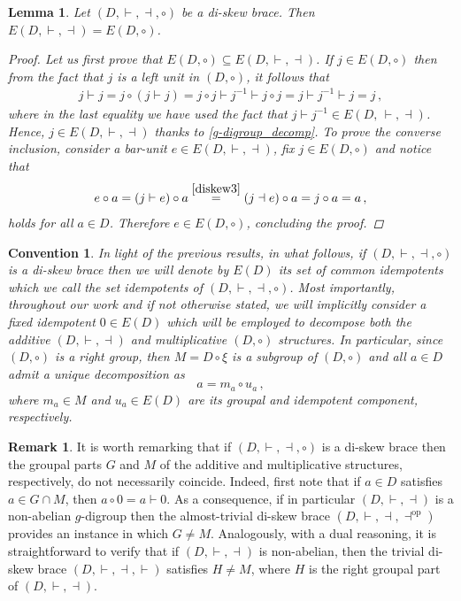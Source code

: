 \documentclass[preprint,1p]{elsarticle}
\numberwithin{equation}{section}
\newtheorem{lemma}[theor]{Lemma}
\newtheorem{convention}[theor]{Convention}
\theoremstyle{definition}               %
\newtheorem{rem}[theor]{Remark}
\newcommand{\vd}{\vdash}
\newcommand{\dv}{\dashv}
\newcommand{\overeq}[1]{\overset{#1}{=}}
\begin{document}
\begin{lemma}\label{common_idemp}
    Let $(D,\vd,\dv,\circ)$ be a di-skew brace.
    Then $E(D,\vd,\dv) = E(D,\circ)$.
    \begin{proof}
        Let us first prove that $E(D,\circ) \subseteq E(D,\vd,\dv)$.
        If $j \in E(D,\circ)$ then from the fact that $j$ is a left unit in $(D,\circ)$, it follows that
        \begin{align*}
            j \vd j = j \circ (j \vd j) 
            = j \circ j \vd j^{-1} \vd j \circ j 
            = j \vd j^{-1} \vd j 
            = j \,,
        \end{align*}
        where in the last equality we have used the fact that $j \vd j^{-1} \in E(D,\,\vd,\dv)$.
        Hence, ${j \in E(D,\vd,\dv)}$ thanks to \cref{g-digroup_decomp}.
        To prove the converse inclusion, consider a bar-unit $e \in E(D,\vd,\dv)$, fix $j \in E(D,\circ)$ and notice that 
        \begin{align*}
            e \circ a = (j \vd e) \circ a \overeq{\eqref{diskew3}} (j \dv e) \circ a = j \circ a = a \,,
        \end{align*}
        holds for all $a \in D$.
        Therefore $e \in E(D,\circ)$, concluding the proof.
    \end{proof}
\end{lemma}

\begin{convention}\label{convenzione}
    \textnormal{In light of the previous results, in what follows, if $(D,\vd,\dv,\circ)$ is a di-skew brace then we will denote by $E(D)$ its set of common idempotents which we call the set \emph{idempotents} of $(D,\vd,\dv,\circ)$.
    Most importantly, throughout our work and if not otherwise stated, we will implicitly consider a fixed idempotent $0 \in E(D)$ which will be employed to decompose both the additive $(D,\vd,\dv)$ and multiplicative $(D,\circ)$ structures.
    In particular, since $(D,\circ)$ is a right group, then $M = D \circ \xi$ is a subgroup of $(D,\circ)$ and all $a \in D$ admit a unique decomposition as 
    $$
    a = m_a \circ u_a \,,
    $$
    where $m_a\in M$ and $u_a\in E(D)$ are its groupal and idempotent component, respectively.}
\end{convention}

\begin{rem}
    It is worth remarking that if $(D,\vd,\dv,\circ)$ is a di-skew brace then the groupal parts $G$ and $M$ of the additive and multiplicative structures, respectively, do not necessarily coincide.
    Indeed, first note that if $a\in D$ satisfies $a\in G \cap M$, then $a \circ 0 = a \vd 0$.
    As a consequence, if in particular $(D,\vd,\dv)$ is a non-abelian $g$-digroup then the almost-trivial di-skew brace $(D,\vd,\dv,\dv^{\text{op}})$ provides an instance in which $G \neq M$.
    Analogously, with a dual reasoning, it is straightforward to verify that if $(D,\vd,\dv)$ is non-abelian, then the trivial di-skew brace $(D,\vd,\dv,\vd)$ satisfies $H \neq M$, where $H$ is the right groupal part of $(D,\vd,\dv)$.
\end{rem}
\end{document}
